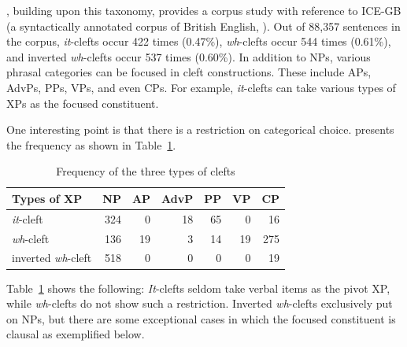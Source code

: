 \noindent \citet{kim:07}, building upon this taxonomy, provides a
corpus study with reference to ICE-GB (a syntactically annotated
corpus of British English, \citealt{nelson:etal:02}). Out of 88,357
sentences in the corpus, \textit{it}-clefts occur 422 times (0.47\%),
\textit{wh}-clefts occur 544 times (0.61\%), and inverted
\textit{wh}-clefts occur 537 times (0.60\%). In addition to NPs,
various phrasal categories can be focused in cleft
constructions. These include APs, AdvPs, PPs, VPs, and even CPs. For
example, \textit{it}-clefts can take various types of XPs as the
focused constituent.





\noindent One interesting point is that there is a restriction on
categorical choice. \citet[220--223]{kim:07} presents the
frequency as shown in Table~\ref{tbl:freq:cleft}.


\begin{table}[!h]
\caption{Frequency of the three types of clefts \citep{kim:07}}   
\centering
\begin{tabular}{|l||r|r|r|r|r|r|}
\hline
Types of XP & NP & AP & AdvP & PP & VP & CP \\
\hline
\textit{it}-cleft & 324 & 0 & 18 & 65 & 0 & 16 \\
\hline
\textit{wh}-cleft & 136 & 19 & 3 & 14 & 19 & 275 \\
\hline
inverted \textit{wh}-cleft & 518 & 0 & 0 & 0 & 0 & 19 \\
\hline
\end{tabular}
\label{tbl:freq:cleft}
\end{table}

Table~\ref{tbl:freq:cleft} shows the following: \textit{It}-clefts
seldom take verbal items as the pivot XP, while \textit{wh}-clefts do
not show such a restriction.  Inverted \textit{wh}-clefts exclusively
put  on NPs, but there are some exceptional cases in which the
focused constituent is clausal as exemplified below.



